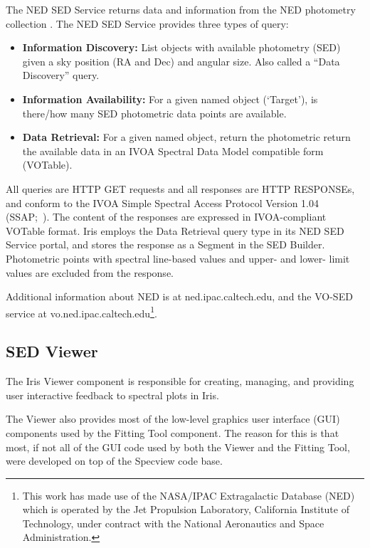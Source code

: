 \documentclass[5p]{elsarticle}
\begin{document}
The NED SED Service returns data and information from the NED photometry collection \citep{2007ASPC..376..153M}. The NED SED Service provides three types of query:
\begin{itemize}
 \item \textbf{Information Discovery:} List objects with available photometry (SED) given a sky position (RA and Dec) and angular size.  Also called a ``Data Discovery'' query.
 \item \textbf{Information Availability:} For a given named object (`Target'), is there/how many SED photometric data points are available.
 \item \textbf{Data Retrieval:} For a given named object, return the photometric return the available data in an IVOA Spectral Data Model compatible form (VOTable).
\end{itemize}

All queries are HTTP GET requests and all responses are HTTP RESPONSEs, and conform to the IVOA Simple Spectral Access Protocol Version 1.04 (SSAP;~\citep{2012arXiv1203.5725T}).  The content of the responses are expressed in IVOA-compliant VOTable format. Iris employs the Data Retrieval query type in its NED SED Service portal, and stores the response as a Segment in the SED Builder. Photometric points with spectral line-based values and upper- and lower- limit values are excluded from the response.

Additional information about NED is at ned.ipac.caltech.edu, and the VO-SED service at
vo.ned.ipac.caltech.edu\footnote{This work has made use of the NASA/IPAC Extragalactic Database (NED) which is operated by the Jet Propulsion Laboratory, California Institute of Technology, under contract with the National Aeronautics and Space Administration.}.

\subsection{SED Viewer}
\label{subsec:specview}
The Iris Viewer component is responsible for creating, managing, and providing user interactive feedback to spectral plots in Iris.

The Viewer also provides most of the low-level graphics user interface (GUI) components used by the Fitting Tool component. The reason for this is that most, if not all of the GUI code used by both the Viewer and the Fitting Tool, were developed on top of the Specview code base.
\end{document}
